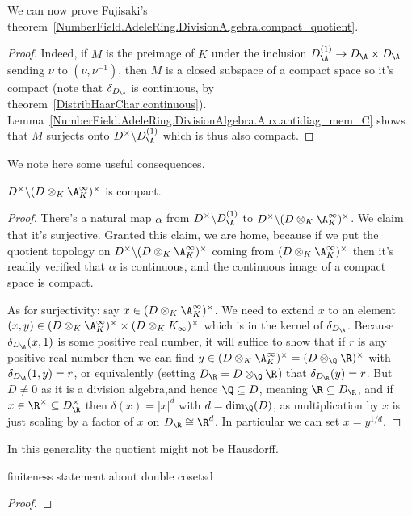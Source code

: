 We can now prove Fujisaki's theorem~\ref{NumberField.AdeleRing.DivisionAlgebra.compact_quotient}.

\begin{proof}
  Indeed, if $M$ is the preimage of $K$ under the inclusion $D_{\A}^{(1)} \to D_{\A}\times D_{\A}$
  sending $\nu$ to $(\nu,\nu^{-1})$, then $M$ is a closed subspace
    of a compact
  space so it's compact (note that $\delta_{D_{\A}}$ is continuous,
  by theorem~\ref{DistribHaarChar.continuous}).
  Lemma~\ref{NumberField.AdeleRing.DivisionAlgebra.Aux.antidiag_mem_C} shows that $M$ surjects onto
  $D^\times\backslash D_{\A}^{(1)}$ which is thus also compact.
\end{proof}

We note here some useful consequences.

\begin{theorem}
  \label{NumberField.FiniteAdeleRing.DivisionAlgebra.units_cocompact}
  $D^\times\backslash(D\otimes_K\A_K^\infty)^\times$ is compact.
\end{theorem}
\begin{proof}
There's a natural map $\alpha$ from $D^\times\backslash D_{\A}^{(1)}$ to
  $D^\times\backslash (D\otimes_K \A_K^\infty)^\times$. We claim that it's
  surjective. Granted this claim, we are home, because if we put the quotient
  topology on $D^\times\backslash (D\otimes_K \A_K^\infty)^\times$ coming from
  $(D\otimes_K \A_K^\infty)^\times$ then it's readily verified that $\alpha$
  is continuous, and the continuous image of a compact space is compact.

  As for surjectivity: say $x\in (D\otimes_K \A_K^\infty)^\times$. We need to extend
  $x$ to an element $(x,y)\in (D\otimes_K \A_K^\infty)^\times\times(D\otimes_K K_\infty)^\times$
  which is in the kernel of $\delta_{D_{\A}}$. Because $\delta_{D_{\A}}(x,1)$ is some positive
  real number, it will suffice to show that if $r$ is any positive real number then we can
  find $y\in (D\otimes_K \A_K^\infty)^\times=(D\otimes_{\Q}\R)^\times$ with $\delta_{D_{\A}}(1,y)=r$,
  or equivalently (setting $D_{\R}=D\otimes_{\Q}\R$) that $\delta_{D_{\R}}(y)=r$.
  But $D\not=0$ as it is a division algebra,and hence $\Q\subseteq D$, meaning
  $\R\subseteq D_{\R}$, and if
  $x\in\R^\times\subseteq D_{\R}^\times$ then $\delta(x)=|x|^d$ with $d=\dim_{\Q}(D)$,
  as multiplication by $x$ is just scaling by a factor of $x$ on $D_{\R}\cong\R^d$.
  In particular we can set $x=y^{1/d}$.
\end{proof}
\begin{remark} In this generality the quotient might not be Hausdorff.
\end{remark}

\begin{theorem} finiteness statement about double cosetsd
\end{theorem}
\begin{proof}
\end{proof}

